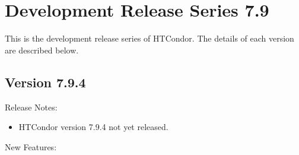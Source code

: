 
\section{\label{sec:History-7-9}Development Release Series 7.9}

This is the development release series of HTCondor.
The details of each version are described below.

\subsection*{\label{sec:New-7-9-4}Version 7.9.4}

\noindent Release Notes:

\begin{itemize}

\item HTCondor version 7.9.4 not yet released.

\end{itemize}


\noindent New Features:

